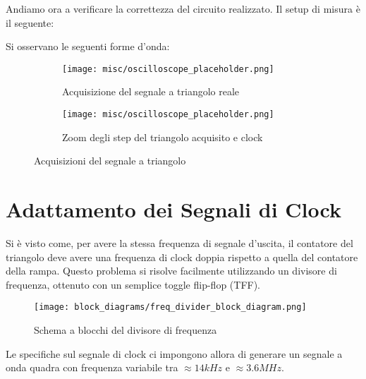 Andiamo ora a verificare la correttezza del circuito realizzato. Il setup di misura è il
seguente:
\medskip


Si osservano le seguenti forme d'onda:
\medskip

\begin{figure}[ht]
    \centering

    \begin{subfigure}{.5\textwidth}
        \centering
        \texttt{[image: misc/oscilloscope\_placeholder.png]}
        \caption{Acquisizione del segnale a triangolo reale}
        \label{acq_triangle}
    \end{subfigure}%
    \begin{subfigure}{.5\textwidth}
        \centering
        \texttt{[image: misc/oscilloscope\_placeholder.png]}
        \caption{Zoom degli step del triangolo acquisito e clock}
        \label{acq_triangle_steps}
    \end{subfigure}

    \caption{Acquisizioni del segnale a triangolo}
    \label{acq_triangle_signals}
\end{figure}


\section{Adattamento dei Segnali di Clock}


Si è visto come, per avere la stessa frequenza di segnale d'uscita, il contatore del
triangolo deve avere una frequenza di clock doppia rispetto a quella del contatore della
rampa. Questo problema si risolve facilmente utilizzando un divisore di frequenza,
ottenuto con un semplice toggle flip-flop (TFF).
\medskip

\begin{figure}[ht]
    \centering
    \texttt{[image: block\_diagrams/freq\_divider\_block\_diagram.png]}
    \caption{Schema a blocchi del divisore di frequenza}
    \label{freq_divider_block_diagram}
\end{figure}

Le specifiche sul segnale di clock ci impongono allora di generare un segnale a onda quadra
con frequenza variabile tra $\approx14kHz$ e $\approx3.6MHz$.

